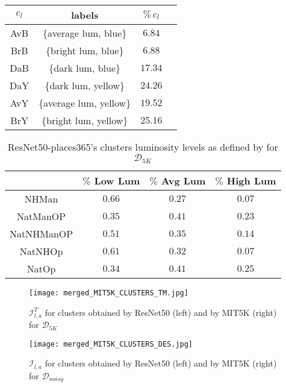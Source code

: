 \documentclass[12pt]{spieman}  %
\begin{document}
\begin{spacing}{2}
\begin{linenumbers}
\begin{table}[ht]
\begin{minipage}{.5\textwidth}
\begin{tabular}{c||c|c|c}
			\hline
			$c_l$ & labels  & $\% \, c_l$\\
			\hline\hline
			AvB & \{average lum, blue\}  & $6.84$ \\
			\hline
			BrB & \{bright lum, blue\}  & $6.88$ \\
			\hline
			DaB & \{dark lum, blue\}  & $17.34$ \\
			\hline		
			DaY & \{dark lum, yellow\}  & $24.26$ \\
			\hline
			AvY & \{average lum, yellow\}  & $19.52$ \\
			\hline
			BrY & \{bright lum, yellow\}  & $25.16$ \\
			\hline
		\end{tabular}
		\label{clusters_dn}
		\vspace{90pt}
    \end{minipage}
\label{table:cluster_stats}
\end{table}





\begin{table}[!t]
	\renewcommand{\arraystretch}{1.3}
	\caption{ResNet50-places365's clusters luminosity levels as defined by \clustname for $\mathcal{D}_{5K}$}
	\centering
	\begin{tabular}{c||c|c|c}
		\hline
		& $\%$ Low Lum & $\%$ Avg Lum & $\%$ High Lum\\
		\hline\hline
		NHMan & $0.66$ & $0.27$  & $0.07$\\
		\hline
		NatManOP & $0.35$ & $0.41$  & $0.23$\\
		\hline
		NatNHManOP & $0.51$ & $0.35$  & $0.14$\\
		\hline
		NatNHOp  & $0.61$ & $0.32$  & $0.07$\\
		\hline
		NatOp  & $0.34$ & $0.41$  & $0.25$\\
		\hline
	\end{tabular}
	\label{table:scenes_cluster_luminosity_mit}
\end{table}


\begin{figure*}[!t]
	\centering
	\texttt{[image: merged\_MIT5K\_CLUSTERS\_TM.jpg]}
	\caption{$\mathcal{I}^T_{l,a}$ for clusters obtained by ResNet50 (left) and by MIT5K (right) for $\mathcal{D}_{5K}$}
	\label{fig:ds_test_clustname}
\end{figure*}



\begin{figure*}[!t]
	\centering
	\texttt{[image: merged\_MIT5K\_CLUSTERS\_DES.jpg]}
	\caption{$\mathcal{I}_{l,a}$ for clusters obtained by ResNet50 (left) and by MIT5K (right) for $\mathcal{D}_{noisy}$}
	\label{fig:ds_test_clustname_denoising}
\end{figure*}




\end{linenumbers}
\end{spacing}
\end{document}
